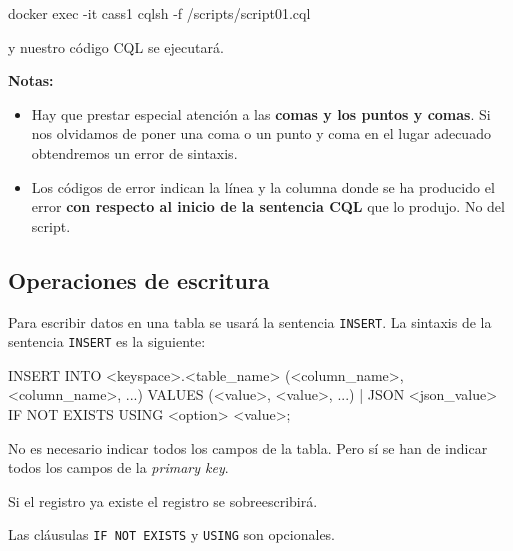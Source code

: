 \documentclass[
]{book}
\newenvironment{Shaded}{}{}
\newcommand{\AttributeTok}[1]{\textcolor[rgb]{0.49,0.56,0.16}{#1}}
\newcommand{\ExtensionTok}[1]{#1}
\newcommand{\NormalTok}[1]{#1}
\providecommand{\tightlist}{%
  \setlength{\itemsep}{0pt}\setlength{\parskip}{0pt}}
\begin{document}
\begin{Shaded}
\begin{Highlighting}[]
\ExtensionTok{docker}\NormalTok{ exec }\AttributeTok{{-}it}\NormalTok{ cass1 cqlsh }\AttributeTok{{-}f}\NormalTok{ /scripts/script01.cql}
\end{Highlighting}
\end{Shaded}

y nuestro código CQL se ejecutará.

\textbf{Notas:}

\begin{itemize}
\tightlist
\item
  Hay que prestar especial atención a las \textbf{comas y los puntos y comas}. Si nos olvidamos de poner una coma o un punto y coma en el lugar adecuado obtendremos un error de sintaxis.
\item
  Los códigos de error indican la línea y la columna donde se ha producido el error \textbf{con respecto al inicio de la sentencia CQL} que lo produjo. No del script.
\end{itemize}

\subsection{Operaciones de escritura}\label{operaciones-de-escritura}

Para escribir datos en una tabla se usará la sentencia \texttt{INSERT}. La sintaxis de la sentencia \texttt{INSERT} es la siguiente:

\begin{Shaded}
\begin{Highlighting}[]
\NormalTok{INSERT INTO \textless{}keyspace\textgreater{}.\textless{}table\_name\textgreater{} (\textless{}column\_name\textgreater{}, \textless{}column\_name\textgreater{}, ...)}
\NormalTok{VALUES (\textless{}value\textgreater{}, \textless{}value\textgreater{}, ...) | JSON \textless{}json\_value\textgreater{}}
\NormalTok{IF NOT EXISTS}
\NormalTok{USING \textless{}option\textgreater{} \textless{}value\textgreater{};}
\end{Highlighting}
\end{Shaded}

No es necesario indicar todos los campos de la tabla. Pero sí se han de indicar todos los campos de la \emph{primary key}.

Si el registro ya existe el registro se sobreescribirá.

Las cláusulas \texttt{IF\ NOT\ EXISTS} y \texttt{USING} son opcionales.
\end{document}
